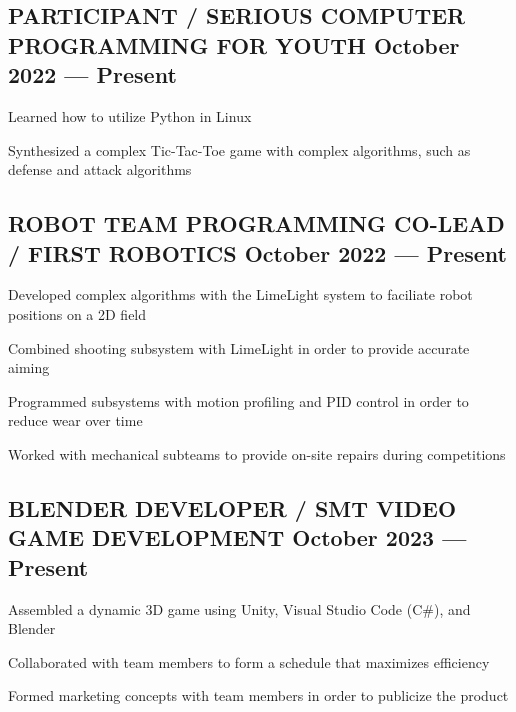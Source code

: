 \subsection{{PARTICIPANT / SERIOUS COMPUTER PROGRAMMING FOR YOUTH \hfill October 2022 --- Present}}
\begin{zitemize}
\item Learned how to utilize Python in Linux
\item Synthesized a complex Tic-Tac-Toe game with complex algorithms, such as defense and attack algorithms
\end{zitemize}

\subsection{{ROBOT TEAM PROGRAMMING CO-LEAD / FIRST ROBOTICS \hfill October 2022 --- Present}}
\begin{zitemize}
\item Developed complex algorithms with the LimeLight system to faciliate robot positions on a 2D field  %
\item Combined shooting subsystem with LimeLight in order to provide accurate aiming
\item Programmed subsystems with motion profiling and PID control in order to reduce wear over time
\item Worked with mechanical subteams to provide on-site repairs during competitions
\end{zitemize}

\subsection{{BLENDER DEVELOPER / SMT VIDEO GAME DEVELOPMENT \hfill October 2023 --- Present}}
\begin{zitemize}
\item Assembled a dynamic 3D game using Unity, Visual Studio Code (C\#), and Blender
\item Collaborated with team members to form a schedule that maximizes efficiency
\item Formed marketing concepts with team members in order to publicize the product
\end{zitemize}

